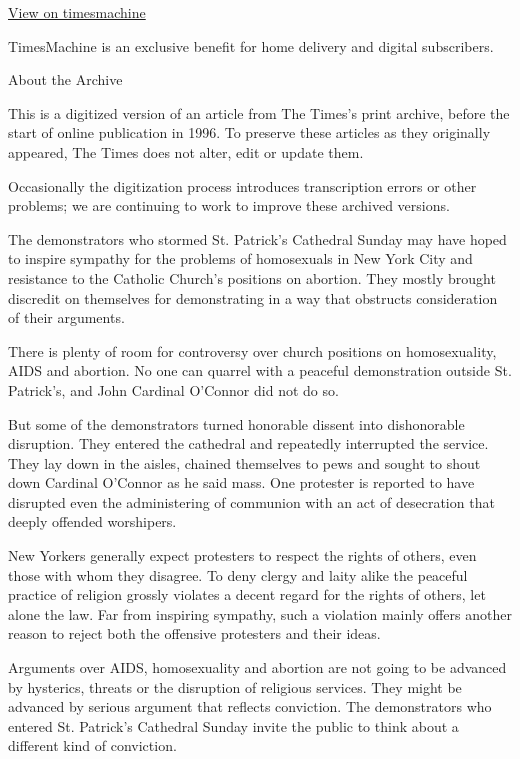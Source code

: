 \href{http://timesmachine.nytimes.com/timesmachine/1989/12/12/236089.html}{View
on timesmachine}

TimesMachine is an exclusive benefit for home delivery and digital
subscribers.

About the Archive

This is a digitized version of an article from The Times's print
archive, before the start of online publication in 1996. To preserve
these articles as they originally appeared, The Times does not alter,
edit or update them.

Occasionally the digitization process introduces transcription errors or
other problems; we are continuing to work to improve these archived
versions.

The demonstrators who stormed St. Patrick's Cathedral Sunday may have
hoped to inspire sympathy for the problems of homosexuals in New York
City and resistance to the Catholic Church's positions on abortion. They
mostly brought discredit on themselves for demonstrating in a way that
obstructs consideration of their arguments.

There is plenty of room for controversy over church positions on
homosexuality, AIDS and abortion. No one can quarrel with a peaceful
demonstration outside St. Patrick's, and John Cardinal O'Connor did not
do so.

But some of the demonstrators turned honorable dissent into dishonorable
disruption. They entered the cathedral and repeatedly interrupted the
service. They lay down in the aisles, chained themselves to pews and
sought to shout down Cardinal O'Connor as he said mass. One protester is
reported to have disrupted even the administering of communion with an
act of desecration that deeply offended worshipers.

New Yorkers generally expect protesters to respect the rights of others,
even those with whom they disagree. To deny clergy and laity alike the
peaceful practice of religion grossly violates a decent regard for the
rights of others, let alone the law. Far from inspiring sympathy, such a
violation mainly offers another reason to reject both the offensive
protesters and their ideas.

Arguments over AIDS, homosexuality and abortion are not going to be
advanced by hysterics, threats or the disruption of religious services.
They might be advanced by serious argument that reflects conviction. The
demonstrators who entered St. Patrick's Cathedral Sunday invite the
public to think about a different kind of conviction.


